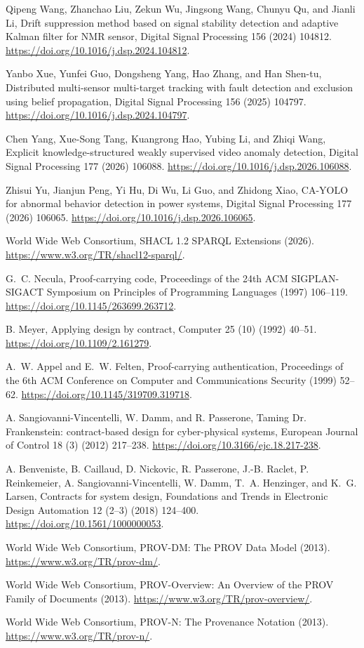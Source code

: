 Qipeng Wang, Zhanchao Liu, Zekun Wu, Jingsong Wang, Chunyu Qu, and Jianli Li,
  Drift suppression method based on signal stability detection and adaptive
  Kalman filter for NMR sensor, Digital Signal Processing 156 (2024) 104812.
\url{https://doi.org/10.1016/j.dsp.2024.104812}.

Yanbo Xue, Yunfei Guo, Dongsheng Yang, Hao Zhang, and Han Shen-tu,
  Distributed multi-sensor multi-target tracking with fault detection and
  exclusion using belief propagation, Digital Signal Processing 156 (2025)
  104797.
\url{https://doi.org/10.1016/j.dsp.2024.104797}.

Chen Yang, Xue-Song Tang, Kuangrong Hao, Yubing Li, and Zhiqi Wang, Explicit
  knowledge-structured weakly supervised video anomaly detection, Digital
  Signal Processing 177 (2026) 106088.
\url{https://doi.org/10.1016/j.dsp.2026.106088}.

Zhisui Yu, Jianjun Peng, Yi Hu, Di Wu, Li Guo, and Zhidong Xiao, CA-YOLO for
  abnormal behavior detection in power systems, Digital Signal Processing 177
  (2026) 106065.
\url{https://doi.org/10.1016/j.dsp.2026.106065}.

{World Wide Web Consortium}, SHACL 1.2 SPARQL Extensions (2026).
\url{https://www.w3.org/TR/shacl12-sparql/}.

G.~C. Necula, Proof-carrying code, Proceedings of the 24th ACM SIGPLAN-SIGACT
  Symposium on Principles of Programming Languages (1997) 106--119.
\url{https://doi.org/10.1145/263699.263712}.

B. Meyer, Applying design by contract, Computer 25 (10) (1992) 40--51.
\url{https://doi.org/10.1109/2.161279}.

A.~W. Appel and E.~W. Felten, Proof-carrying authentication, Proceedings of the
  6th ACM Conference on Computer and Communications Security (1999) 52--62.
\url{https://doi.org/10.1145/319709.319718}.

A. Sangiovanni-Vincentelli, W. Damm, and R. Passerone, Taming Dr.
  Frankenstein: contract-based design for cyber-physical systems, European
  Journal of Control 18 (3) (2012) 217--238.
\url{https://doi.org/10.3166/ejc.18.217-238}.

A. Benveniste, B. Caillaud, D. Nickovic, R. Passerone, J.-B. Raclet,
  P. Reinkemeier, A. Sangiovanni-Vincentelli, W. Damm, T.~A. Henzinger, and
  K.~G. Larsen, Contracts for system design, Foundations and Trends in
  Electronic Design Automation 12 (2--3) (2018) 124--400.
\url{https://doi.org/10.1561/1000000053}.

{World Wide Web Consortium}, PROV-DM: The PROV Data Model (2013).
\url{https://www.w3.org/TR/prov-dm/}.

{World Wide Web Consortium}, PROV-Overview: An Overview of the PROV Family of
  Documents (2013).
\url{https://www.w3.org/TR/prov-overview/}.

{World Wide Web Consortium}, PROV-N: The Provenance Notation (2013).
\url{https://www.w3.org/TR/prov-n/}.
